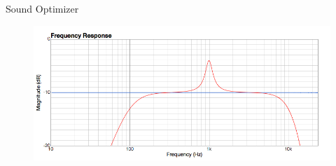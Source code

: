 \documentclass{beamer}
\begin{document}
\begin{frame}[t]{Sound Optimizer}
\begin{figure}[b]
\includegraphics[height=0.37\textwidth]{figure/soundoptimizer.png}
\end{figure}

\end{frame}


\end{document}
